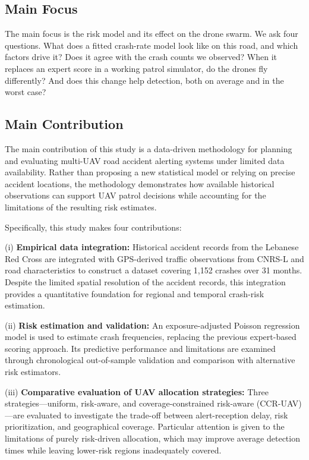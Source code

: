 \documentclass[11pt]{article}
\begin{document}
\subsection{Main Focus}

The main focus is the risk model and its effect on the drone swarm. We ask four
questions. What does a fitted crash-rate model look like on this road, and which
factors drive it? Does it agree with the crash counts we observed? When it
replaces an expert score in a working patrol simulator, do the drones fly
differently? And does this change help detection, both on average and in the
worst case?


\subsection{Main Contribution}

The main contribution of this study is a data-driven methodology for planning and evaluating multi-UAV road accident alerting systems under limited data availability. Rather than proposing a new statistical model or relying on precise accident locations, the methodology demonstrates how available historical observations can support UAV patrol decisions while accounting for the limitations of the resulting risk estimates.

Specifically, this study makes four contributions:

(i) \textbf{Empirical data integration:} Historical accident records from the Lebanese Red Cross are integrated with GPS-derived traffic observations from CNRS-L and road characteristics to construct a dataset covering 1,152 crashes over 31 months. Despite the limited spatial resolution of the accident records, this integration provides a quantitative foundation for regional and temporal crash-risk estimation.

(ii) \textbf{Risk estimation and validation:} An exposure-adjusted Poisson regression model is used to estimate crash frequencies, replacing the previous expert-based scoring approach. Its predictive performance and limitations are examined through chronological out-of-sample validation and comparison with alternative risk estimators.

(iii) \textbf{Comparative evaluation of UAV allocation strategies:} Three strategies—uniform, risk-aware, and coverage-constrained risk-aware (CCR-UAV)—are evaluated to investigate the trade-off between alert-reception delay, risk prioritization, and geographical coverage. Particular attention is given to the limitations of purely risk-driven allocation, which may improve average detection times while leaving lower-risk regions inadequately covered.
\end{document}
